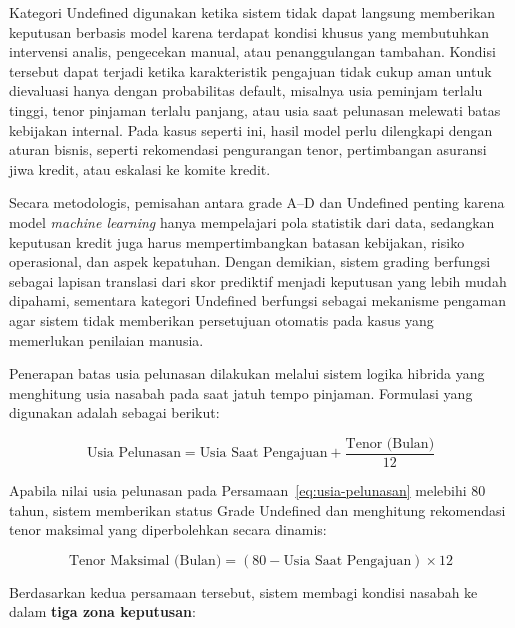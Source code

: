 Kategori Undefined digunakan ketika sistem tidak dapat langsung memberikan keputusan berbasis model karena terdapat kondisi khusus yang membutuhkan intervensi analis, pengecekan manual, atau penanggulangan tambahan. Kondisi tersebut dapat terjadi ketika karakteristik pengajuan tidak cukup aman untuk dievaluasi hanya dengan probabilitas default, misalnya usia peminjam terlalu tinggi, tenor pinjaman terlalu panjang, atau usia saat pelunasan melewati batas kebijakan internal. Pada kasus seperti ini, hasil model perlu dilengkapi dengan aturan bisnis, seperti rekomendasi pengurangan tenor, pertimbangan asuransi jiwa kredit, atau eskalasi ke komite kredit.

Secara metodologis, pemisahan antara grade A--D dan Undefined penting karena model \textit{machine learning} hanya mempelajari pola statistik dari data, sedangkan keputusan kredit juga harus mempertimbangkan batasan kebijakan, risiko operasional, dan aspek kepatuhan. Dengan demikian, sistem grading berfungsi sebagai lapisan translasi dari skor prediktif menjadi keputusan yang lebih mudah dipahami, sementara kategori Undefined berfungsi sebagai mekanisme pengaman agar sistem tidak memberikan persetujuan otomatis pada kasus yang memerlukan penilaian manusia.


Penerapan batas usia pelunasan dilakukan melalui sistem logika hibrida yang menghitung usia nasabah pada saat jatuh tempo pinjaman. Formulasi yang digunakan adalah sebagai berikut:

\begin{equation}
    \text{Usia Pelunasan} = \text{Usia Saat Pengajuan} + \frac{\text{Tenor (Bulan)}}{12}
    \label{eq:usia-pelunasan}
\end{equation}

Apabila nilai usia pelunasan pada Persamaan~\ref{eq:usia-pelunasan} melebihi 80 tahun, sistem memberikan status Grade Undefined dan menghitung rekomendasi tenor maksimal yang diperbolehkan secara dinamis:

\begin{equation}
    \text{Tenor Maksimal (Bulan)} = (80 - \text{Usia Saat Pengajuan}) \times 12
    \label{eq:tenor-maks}
\end{equation}

Berdasarkan kedua persamaan tersebut, sistem membagi kondisi nasabah ke dalam \textbf{tiga zona keputusan}:

